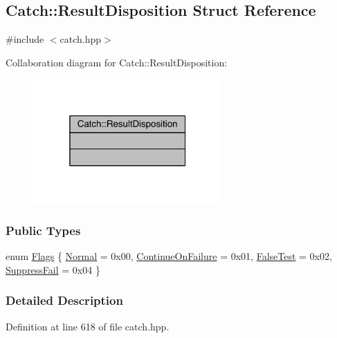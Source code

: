 \hypertarget{a00068}{}\subsection{Catch\+:\+:Result\+Disposition Struct Reference}
\label{a00068}


{\ttfamily \#include $<$catch.\+hpp$>$}



Collaboration diagram for Catch\+:\+:Result\+Disposition\+:\nopagebreak
\begin{figure}[H]
\begin{center}
\leavevmode
\includegraphics[width=205pt]{a00253}
\end{center}
\end{figure}
\subsubsection*{Public Types}
\begin{DoxyCompactItemize}
\item 
enum \hyperlink{a00068_a3396cad6e2259af326b3aae93e23e9d8}{Flags} \{ \hyperlink{a00068_a3396cad6e2259af326b3aae93e23e9d8af3bd52347ed6f8796e8ce2f77bb39ea5}{Normal} = 0x00, 
\hyperlink{a00068_a3396cad6e2259af326b3aae93e23e9d8aa18c94bd60c5614e17a84c2ced3bbfd5}{Continue\+On\+Failure} = 0x01, 
\hyperlink{a00068_a3396cad6e2259af326b3aae93e23e9d8a9980604245f19884691f941dec03eeb8}{False\+Test} = 0x02, 
\hyperlink{a00068_a3396cad6e2259af326b3aae93e23e9d8a1a88eb6004bddee4ccae4b421991bf54}{Suppress\+Fail} = 0x04
 \}
\end{DoxyCompactItemize}


\subsubsection{Detailed Description}


Definition at line 618 of file catch.\+hpp.



